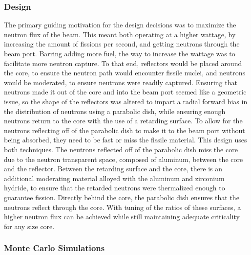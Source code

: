 \subsubsection{Design}

The primary guiding motivation for the design decisions was to maximize the neutron flux of the beam. This meant both operating at a higher wattage, by increasing the amount of fissions per second, and getting neutrons through the beam port. Barring adding more fuel, the way to increase the wattage was to facilitate more neutron capture. To that end, reflectors would be placed around the core, to ensure the neutron path would encounter fissile nuclei, and neutrons would be moderated, to ensure neutrons were readily captured. Ensuring that neutrons made it out of the core and into the beam port seemed like a geometric issue, so the shape of the reflectors was altered to impart a radial forward bias in the distribution of neutrons using a parabolic dish, while ensuring enough neutrons return to the core with the use of a retarding surface. To allow for the neutrons reflecting off of the parabolic dish to make it to the beam port without being absorbed, they need to be fast or miss the fissile material. This design uses both techniques. The neutrons reflected off of the parabolic dish miss the core due to the neutron transparent space, composed of aluminum, between the core and the reflector. Between the retarding surface and the core, there is an additional moderating material alloyed with the aluminum and zirconium hydride, to ensure that the retarded neutrons were thermalized enough to guarantee fission. Directly behind the core, the parabolic dish ensures that the neutrons reflect through the core. With tuning of the ratios of these surfaces, a higher neutron flux can be achieved while still maintaining adequate criticality for any size core.


\subsubsection{Monte Carlo Simulations}

